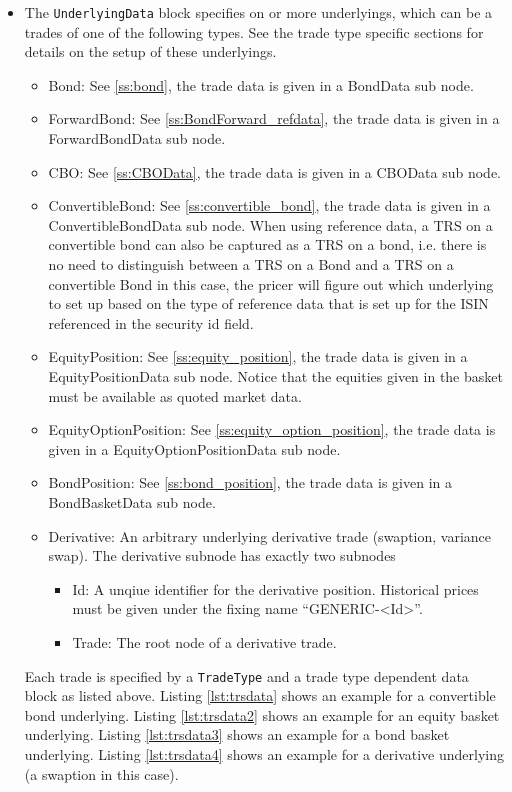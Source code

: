 \begin{itemize}
\item The {\tt UnderlyingData} block specifies on or more underlyings, which can be a trades of one of the following
  types. See the trade type specific sections for details on the setup of these underlyings.
  \begin{itemize}
  \item Bond: See \ref{ss:bond}, the trade data is given in a BondData sub node.
  \item ForwardBond: See \ref{ss:BondForward_refdata}, the trade data is given in a ForwardBondData sub node.
  \item CBO: See \ref{ss:CBOData}, the trade data is given in a CBOData sub node.
  \item ConvertibleBond: See \ref{ss:convertible_bond}, the trade data is given in a ConvertibleBondData sub
    node. When using reference data, a TRS on a convertible bond can also be captured as a TRS on a bond, i.e. there is
    no need to distinguish between a TRS on a Bond and a TRS on a convertible Bond in this case, the pricer will figure
    out which underlying to set up based on the type of reference data that is set up for the ISIN referenced in the
    security id field.
  \item EquityPosition: See \ref{ss:equity_position}, the trade data is given in a EquityPositionData sub
    node. Notice that the equities given in the basket must be available as quoted market data.
  \item EquityOptionPosition: See \ref{ss:equity_option_position}, the trade data is given in a EquityOptionPositionData
    sub node.
  \item BondPosition: See \ref{ss:bond_position}, the trade data is given in a BondBasketData sub node.
  \item Derivative: An arbitrary underlying derivative trade (swaption, variance swap). The derivative subnode has
    exactly two subnodes
    \begin{itemize}
      \item Id: A unqiue identifier for the derivative position. Historical prices must be given under the fixing name
        ``GENERIC-<Id>''.
      \item Trade: The root node of a derivative trade.
    \end{itemize}

  \end{itemize}

  Each trade is specified by a \verb+TradeType+ and a trade type dependent data block as listed above. Listing
  \ref{lst:trsdata} shows an example for a convertible bond underlying. Listing \ref{lst:trsdata2} shows an example for
  an equity basket underlying. Listing \ref{lst:trsdata3} shows an example for a bond basket underlying. Listing
  \ref{lst:trsdata4} shows an example for a derivative underlying (a swaption in this case).


\end{itemize}
